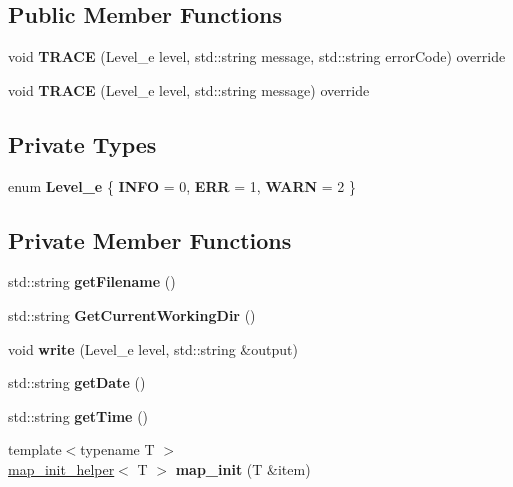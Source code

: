 \subsection*{Public Member Functions}
\begin{DoxyCompactItemize}
\item 
\mbox{\label{classStatusLogger_ab1b31ad74fac19bddddb34949b3eb0a1}} 
void {\bfseries T\+R\+A\+CE} (Level\+\_\+e level, std\+::string message, std\+::string error\+Code) override
\item 
\mbox{\label{classStatusLogger_a9cd751e71f814914694e9c4ed39df0f9}} 
void {\bfseries T\+R\+A\+CE} (Level\+\_\+e level, std\+::string message) override
\end{DoxyCompactItemize}
\subsection*{Private Types}
\begin{DoxyCompactItemize}
\item 
\mbox{\label{classLogger_aa1875ace78bce45b33f84d7f5de7790d}} 
enum {\bfseries Level\+\_\+e} \{ {\bfseries I\+N\+FO} = 0, 
{\bfseries E\+RR} = 1, 
{\bfseries W\+A\+RN} = 2
 \}
\end{DoxyCompactItemize}
\subsection*{Private Member Functions}
\begin{DoxyCompactItemize}
\item 
\mbox{\label{classStatusLogger_a68965a0651d02b978a389d34d5c1fec3}} 
std\+::string {\bfseries get\+Filename} ()
\item 
\mbox{\label{classStatusLogger_aa48b918db673aaeb1c663b7e0cad6655}} 
std\+::string {\bfseries Get\+Current\+Working\+Dir} ()
\item 
\mbox{\label{classStatusLogger_aa110fa026ef5e5a6a5b250623c73faa6}} 
void {\bfseries write} (Level\+\_\+e level, std\+::string \&output)
\item 
\mbox{\label{classLogger_ac05df84a2b15ca6e1b3b6119a3b7a32c}} 
std\+::string {\bfseries get\+Date} ()
\item 
\mbox{\label{classLogger_af6e809c7f6fe8d2f829ce0d6a760e0ce}} 
std\+::string {\bfseries get\+Time} ()
\item 
\mbox{\label{classLogger_a8416f3e0b6fa98d42ca890c0577dff34}} 
{\footnotesize template$<$typename T $>$ }\\\hyperlink{structLogger_1_1map__init__helper}{map\+\_\+init\+\_\+helper}$<$ T $>$ {\bfseries map\+\_\+init} (T \&item)
\end{DoxyCompactItemize}
